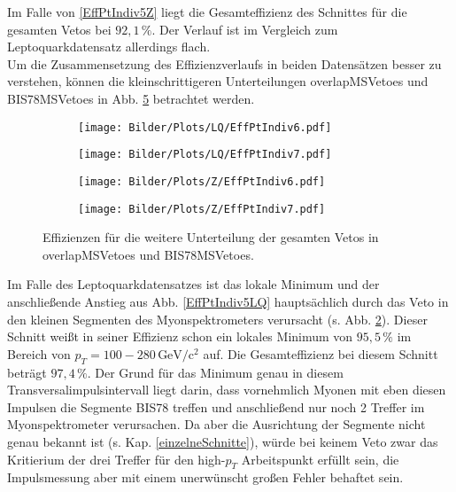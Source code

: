 Im Falle von \ref{EffPtIndiv5Z} liegt die Gesamteffizienz des Schnittes für die gesamten Vetos bei $92,1\,\%$. Der Verlauf ist im Vergleich zum Leptoquarkdatensatz allerdings flach.\\ 
Um die Zusammensetzung des Effizienzverlaufs in beiden Datensätzen besser zu verstehen, können die kleinschrittigeren Unterteilungen overlapMSVetoes und BIS78MS\-Vetoes in Abb. \ref{EffPtIndiv6UND7} betrachtet werden. 
\begin{figure}
  \begin{subfigure}[t]{0.55\textwidth}
  \texttt{[image: Bilder/Plots/LQ/EffPtIndiv6.pdf]}
  \label{Indiv6LQ}
  \end{subfigure}
\begin{subfigure}[t]{0.55\textwidth}
 \texttt{[image: Bilder/Plots/LQ/EffPtIndiv7.pdf]}
  \label{Indiv7LQ}
\end{subfigure}
\begin{subfigure}[t]{0.55\textwidth}
  \texttt{[image: Bilder/Plots/Z/EffPtIndiv6.pdf]}
  \label{Indiv6Z}
\end{subfigure}
\begin{subfigure}[t]{0.55\textwidth}
  \texttt{[image: Bilder/Plots/Z/EffPtIndiv7.pdf]}
  \label{Indiv7Z}
\end{subfigure}
\caption{Effizienzen für die weitere Unterteilung der gesamten Vetos in overlapMSVetoes und BIS78MSVetoes.}
\label{EffPtIndiv6UND7}
\end{figure} 
Im Falle des Leptoquarkdatensatzes ist das lokale Minimum und der anschließende Anstieg aus Abb. \ref{EffPtIndiv5LQ} hauptsächlich durch das Veto in den kleinen Segmenten des Myonspektrometers verursacht (s. Abb. \ref{Indiv7LQ}). Dieser Schnitt weißt in seiner Effizienz schon ein lokales Minimum von $95,5\,\%$ im Bereich von $p_T=100-280\,\text{GeV}/\text{c}^2$ auf. Die Gesamteffizienz bei diesem Schnitt beträgt $97,4\,\%$. Der Grund für das Minimum genau in diesem Transversalimpulsintervall liegt darin, dass vornehmlich Myonen mit eben diesen Impulsen die Segmente BIS78 treffen und anschließend nur noch 2 Treffer im Myonspektrometer verursachen. Da aber die Ausrichtung der Segmente nicht genau bekannt ist (s. Kap. \ref{einzelneSchnitte}), würde bei keinem Veto zwar das Kritierium der drei Treffer für den high-$p_T$ Arbeitspunkt erfüllt sein, die Impulsmessung aber mit einem unerwünscht großen Fehler behaftet sein.\\ %
